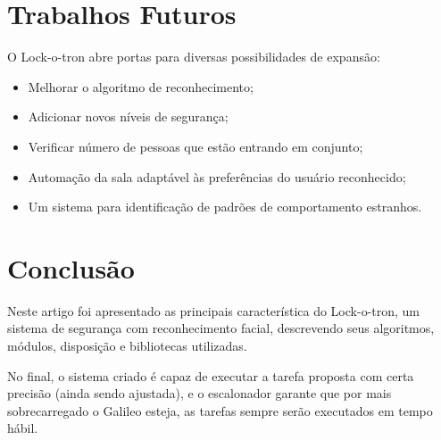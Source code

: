 \documentclass[12pt]{article}
\begin{document}

\section{Trabalhos Futuros}
    O Lock-o-tron abre portas para diversas possibilidades de expansão:
    \begin{itemize}
        \item Melhorar o algoritmo de reconhecimento;
        \item Adicionar novos níveis de segurança;
        \item Verificar número de pessoas que estão entrando em conjunto;
        \item Automação da sala adaptável às preferências do usuário reconhecido;
        \item Um sistema para identificação de padrões de comportamento estranhos.
    \end{itemize}

\section{Conclusão}
    Neste artigo foi apresentado as principais característica do Lock-o-tron, um
    sistema de segurança com reconhecimento facial, descrevendo seus algoritmos,
    módulos, disposição e bibliotecas utilizadas.

    No final, o sistema criado é capaz de executar a tarefa proposta com certa
    precisão (ainda sendo ajustada), e o escalonador garante que por mais
    sobrecarregado o Galileo esteja, as tarefas sempre serão executados em tempo
    hábil.

% 
% 
\end{document}
